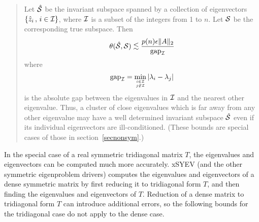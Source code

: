 \begin{quote}
Let ${\hat{\cal S}}$ be the invariant subspace spanned by a collection of eigenvectors
$\{\hat{z}_i \, , \, i \in {\cal I}\}$, where $\cal I$ is a subset of the
integers from 1 to $n$. Let ${\cal S}$ be the corresponding true subspace. Then
\[
\theta ( \hatcalS , \calS ) \leapproxeq \frac{p(n) \epsilon \|A\|_2}
{\gap_{\cal I}}
\]
where
\[
{\rm gap}_{\cal I} = \min_{i \in {\cal I} \atop j \not\in {\cal I}}
| \lambda_i - \lambda_j |
\]
is the absolute gap between the eigenvalues in $\cal I$ and the nearest
other eigenvalue. Thus, a cluster of
close eigenvalues which is
far away from any other eigenvalue may have a well determined
invariant subspace ${\hat{\cal S}}$ even if its individual eigenvectors are
ill-conditioned. (These bounds are special
cases of those in section~\ref{secnonsym}.)
\end{quote}

In the special case of a real symmetric tridiagonal matrix $T$, the eigenvalues
and eigenvectors can be computed much more accurately. xSYEV (and the other
symmetric eigenproblem drivers) computes the eigenvalues and eigenvectors of
a dense symmetric matrix by first reducing it to tridiagonal form $T$, and then
finding the eigenvalues and eigenvectors of $T$.
Reduction of a dense matrix to tridiagonal form $T$ can introduce
additional errors, so the following bounds for the tridiagonal case do not
apply to the dense case.

